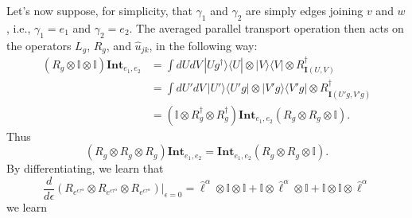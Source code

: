 \documentclass[12pt]{amsart}
\def\CAv{\mathbf{Int}}
\theoremstyle{definition}
\theoremstyle{remark}
\numberwithin{equation}{section}
\begin{document}
Let's now suppose, for simplicity, that $\gamma_1$ and $\gamma_2$ are simply edges joining $v$ and $w$, i.e., $\gamma_1 = e_1$ and $\gamma_2 = e_2$. The averaged parallel transport operation then acts on the operators $L_g$, $R_g$, and $\widehat{u}_{jk}$, in the following way:
\begin{equation}
	\begin{split}
	 (R_g\otimes \mathbb{I} \otimes \mathbb{I}) \CAv_{e_1,e_2} &= \int dUdV \, |Ug^\dag\rangle\langle U| \otimes  |V\rangle\langle V| \otimes R_{\mathbf{I}(U,V)}^\dag \\
	&= \int dU'dV \, |U'\rangle\langle U'g| \otimes  |V' g\rangle\langle V'g| \otimes R_{\mathbf{I}(U'g,V'g)}^\dag \\
	&= (\mathbb{I} \otimes R_g^\dag   \otimes R_g^\dag) \CAv_{e_1,e_2} (R_g \otimes R_g\otimes \mathbb{I}).
	\end{split}
\end{equation}
Thus 
\begin{equation}
	(R_g\otimes R_g \otimes R_g) \CAv_{e_1,e_2} = \CAv_{e_1,e_2} (R_g \otimes R_g\otimes \mathbb{I}).
\end{equation}
By differentiating, we learn that
\begin{equation}
	\frac{d}{d\epsilon} (R_{e^{\epsilon \tau^\alpha}}\otimes R_{e^{\epsilon \tau^\alpha}} \otimes R_{e^{\epsilon \tau^\alpha}}) \Big|_{\epsilon=0} = \widehat{\ell}^{\alpha}\otimes \mathbb{I}\otimes \mathbb{I} + \mathbb{I}\otimes\widehat{\ell}^{\alpha}\otimes  \mathbb{I} +   \mathbb{I}\otimes \mathbb{I}\otimes\widehat{\ell}^{\alpha}
\end{equation}
we learn
\end{document}
